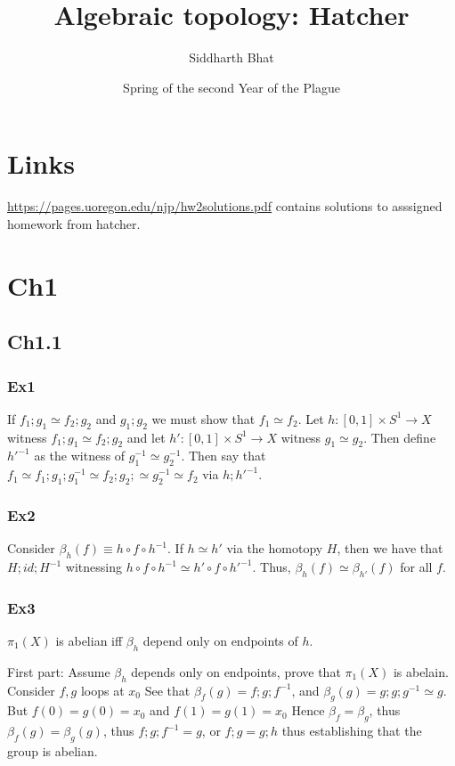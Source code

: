 \documentclass[11pt]{book}
\title{Algebraic topology: Hatcher}
\author{Siddharth Bhat}
\date{Spring of the second Year of the Plague}
\begin{document}
\maketitle
\tableofcontents
\chapter{Links}
\url{https://pages.uoregon.edu/njp/hw2solutions.pdf} contains solutions to asssigned homework from hatcher.
\chapter{Ch1}
\section{Ch1.1}
\subsection{Ex1}
If $f_1 ; g_1 \simeq f_2 ; g_2$ and $g_1 ; g_2$ we must show that $f_1 \simeq f_2$. Let $h: [0, 1] \times S^1 \rightarrow X$
witness $f_1; g_1 \simeq f_2; g_2$ and let $h': [0, 1] \times S^1 \rightarrow X$ witness $g_1 \simeq g_2$. Then
define $h'^{-1}$ as the witness of $g_1^{-1} \simeq g_2^{-1}$. Then say that $f_1 \simeq f_1; g_1; g_1^{-1} \simeq f_2; g_2; \simeq g_2^{-1} \simeq f_2$ via $h; h'^{-1}$.


\subsection{Ex2}
Consider $\beta_h(f) \equiv h \circ f \circ h^{-1}$. If $h \simeq h'$ via the homotopy $H$, then we have that $H; id; H^{-1}$ 
witnessing $h \circ f \circ h^{-1} \simeq h' \circ f \circ h'^{-1}$. Thus, $\beta_h(f) \simeq \beta_{h'}(f)$ for all $f$.

\subsection{Ex3}
$\pi_1(X)$ is abelian iff $\beta_h$ depend only on endpoints of $h$.

First part: Assume $\beta_h$ depends only on endpoints, prove that $\pi_1(X)$ is abelain. Consider $f, g$ loops at $x_0$
See that $\beta_f(g) = f; g; f^{-1}$, and $\beta_g(g) = g; g; g^{-1} \simeq g$. But $f(0) = g(0) = x_0$ and $f(1) = g(1) = x_0$
Hence $\beta_f = \beta_g$, thus $\beta_f(g) = \beta_g(g)$, thus $f; g; f^{-1} = g$, or $f; g = g; h$ thus establishing
that the group is abelian.
\end{document}
